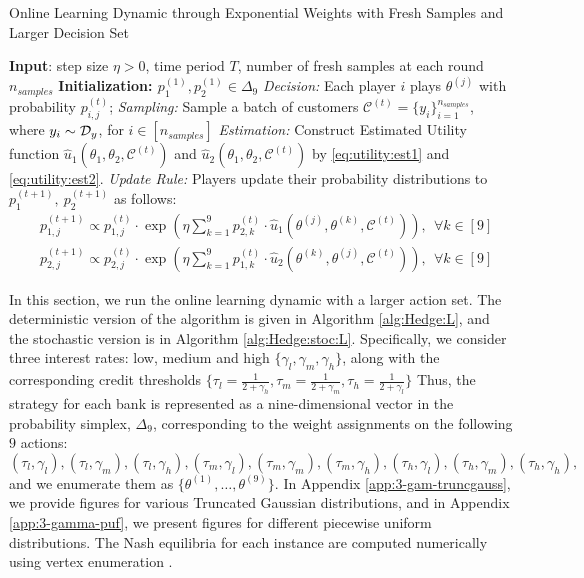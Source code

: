 \begin{algorithm}[h]
\caption{Online Learning Dynamic through Exponential Weights with Fresh Samples and Larger Decision Set}
\begin{algorithmic}
\label{alg:Hedge:stoc:L} 
\STATE \textbf{Input}: step size $\eta>0$, time period $T$, number of fresh samples at each round $n_{samples}$
    \STATE \textbf{Initialization: $p_1^{(1)},p_2^{(1)}\in\Delta_9$}
\STATE \emph{Decision:} Each player $i$ plays $\theta^{(j)}$ with probability $p_{i,j}^{(t)}$;
\STATE \emph{Sampling:} Sample a batch of customers $\mathcal{C}^{(t)}=\{y_i\}_{i=1}^{n_{samples}}$, where $y_i\sim\mathcal{D}_y$, for $i\in[n_{samples}]$ 
\STATE \emph{Estimation:} Construct Estimated Utility function $\widehat{u}_1(\theta_1, \theta_2, \mathcal{C}^{(t)})$ and $\widehat{u}_2(\theta_1, \theta_2, \mathcal{C}^{(t)}) $ by \eqref{eq:utility:est1} and \eqref{eq:utility:est2}. 
\STATE \emph{Update Rule:} Players update their probability distributions to $p_{1}^{(t+1)},~p_{2}^{(t+1)}$ as follows:
\begin{align*}
&p^{(t+1)}_{1,j}\propto p^{(t)}_{1,j} \cdot \exp\left(\eta \sum_{k=1}^9 p^{(t)}_{2,k} \cdot \widehat{u}_1\left(\theta^{(j)},\theta^{(k)},\mathcal{C}^{(t)}\right)\right),~~\forall k\in[9]\\
&p^{(t+1)}_{2,j}\propto p^{(t)}_{2,j} \cdot \exp\left(\eta \sum_{k=1}^9 p^{(t)}_{1,k} \cdot \widehat{u}_2\left(\theta^{(k)},\theta^{(j)} ,\mathcal{C}^{(t)}\right)\right),~~\forall k\in[9]
\end{align*}
\ENDFOR
\end{algorithmic}
\end{algorithm}
In this section, we run the online learning dynamic with a larger action set. The deterministic version of the algorithm is given in Algorithm \ref{alg:Hedge:L}, and the stochastic version is in Algorithm \ref{alg:Hedge:stoc:L}. Specifically, we consider three interest rates: low, medium and high $\{\gamma_l, \gamma_m, \gamma_h\}$, along with the corresponding credit thresholds $\{\tau_l = \frac{1}{2+\gamma_h}, \tau_m = \frac{1}{2+\gamma_m}, \tau_h = \frac{1}{2+\gamma_l}\}$
Thus, the strategy for each bank is represented as a nine-dimensional vector in the probability simplex, $\Delta_9$, corresponding to the weight assignments on the following $9$ actions:  
$
(\tau_l, \gamma_l), (\tau_l, \gamma_m), (\tau_l, \gamma_h), (\tau_m, \gamma_l), (\tau_m, \gamma_m), (\tau_m, \gamma_h), (\tau_h, \gamma_l), (\tau_h, \gamma_m), (\tau_h, \gamma_h),
$ and we enumerate them as $\{\theta^{(1)},\dots,\theta^{(9)}\}.$ In Appendix \ref{app:3-gam-truncgauss}, we provide figures for various Truncated Gaussian distributions, and in Appendix \ref{app:3-gamma-puf}, we present figures for different piecewise uniform distributions. The Nash equilibria for each instance are computed numerically using vertex enumeration \cite{Nisan_Roughgarden_Tardos_Vazirani_2007}.  

